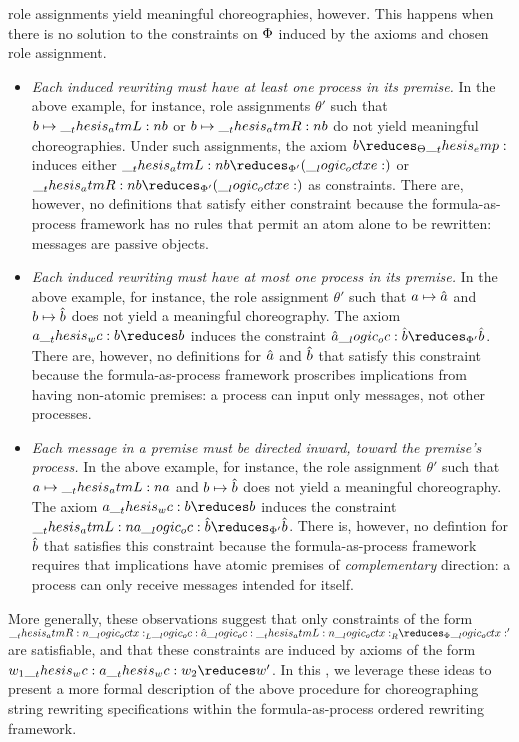  role assignments yield meaningful choreographies, however.
This happens when there is no solution to the constraints on $\Phi$ induced by the axioms and chosen role assignment.
\begin{itemize}
\item
  \emph{Each induced rewriting must have at least one process in its premise.}
  In the above example, for instance, role assignments $\theta'$ such that $b \mapsto \__thesis_atmL:n {b}$ or $b \mapsto \__thesis_atmR:n {b}$ do not yield meaningful choreographies.
  Under such assignments, the axiom $b \reduces_{\srsig} \emp$ induces either $\atmL{b} \reduces_{\orsig'} (\octxe)$ or $\atmR{b} \reduces_{\orsig'} (\octxe)$ as constraints.
  There are, however, no definitions that satisfy either constraint because the formula-as-process framework has no rules that permit an atom alone to be rewritten: messages are passive objects.

\item
  \emph{Each induced rewriting must have at most one process in its premise.}
  In the above example, for instance, the role assignment $\theta'$ such that $a \mapsto \hat{a}$ and $b \mapsto \hat{b}$ does not yield a meaningful choreography.
  The axiom $a \wc b \reduces b$ induces the constraint $\defp{a} \oc \defp{b} \reduces_{\orsig'} \defp{b}$.
  There are, however, no definitions for $\hat{a}$ and $\hat{b}$ that satisfy this constraint because the formula-as-process framework proscribes implications from having non-atomic premises: a process can input only messages, not other processes.

\item
  \emph{Each message in a premise must be directed inward, toward the premise's process.}
  In the above example, for instance, the role assignment $\theta'$ such that $a \mapsto \__thesis_atmL:n {a}$ and $b \mapsto \hat{b}$ does not yield a meaningful choreography.
  The axiom $a \wc b \reduces b$ induces the constraint $\atmL{a} \oc \defp{b} \reduces_{\orsig'} \defp{b}$.
  There is, however, no defintion for $\hat{b}$ that satisfies this constraint because the formula-as-process framework requires that implications have atomic premises of \emph{complementary} direction: a process can only receive messages intended for itself.
\end{itemize}

More generally, these observations suggest that only constraints of the form $\atmR{\octx}_L \oc \defp{a} \oc \atmL{\octx}_R \reduces_{\orsig} \octx'$ are satisfiable, and that these constraints are induced by axioms of the form $w_1 \wc a \wc w_2 \reduces w'$.
In this , we leverage these ideas to present a more formal description of the above procedure for choreographing string rewriting specifications within the formula-as-process ordered rewriting framework.

